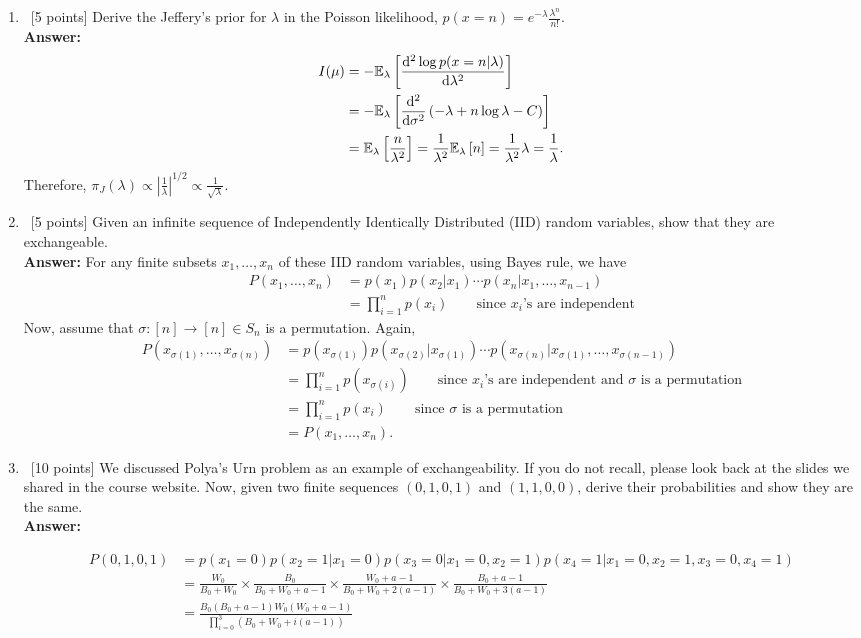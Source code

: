 \documentclass[12pt, fullpage,letterpaper]{article}
\def\red{\color{red}}
\def\blackblue{\color{black!40!blue}}
\begin{document}
\begin{enumerate}
\item~[5 points] Derive the Jeffery's prior for $\lambda$ in the Poisson likelihood, $p(x=n) = e^{-\lambda}\frac{\lambda^n}{n!}$.\\
	{\bf \red Answer:} {\blackblue
	\begin{align*}
	I(\mu) &= -\mathbb{E}_{\lambda}\left[\frac{{\rm d}^2 \log p(x = n|\lambda)}{{\rm d}\lambda^2}\right]\\
	& = - \mathbb{E}_{\lambda}\left[\frac{{\rm d}^2}{{\rm d}\sigma^2}\left(-\lambda + n\log \lambda - C\right)\right]\\
	& = \mathbb{E}_{\lambda}\left[\frac{n}{\lambda^2}\right] = \frac{1}{\lambda^2} \mathbb{E}_{\lambda}\left[n\right] = \frac{1}{\lambda^2}\lambda = \frac{1}{\lambda}.
	\end{align*}
	Therefore, $\pi_J(\lambda) \propto  \left | \frac{1}{\lambda} \right|^{1/2} \propto \frac{1}{\sqrt{\lambda}}.$
	}


\item~[5 points] Given an infinite sequence of Independently Identically Distributed (IID) random variables, show that they are exchangeable.\\
	{\bf \red Answer:} {\blackblue 
	For any finite subsets $x_1,\ldots,x_n$ of these IID random variables, using Bayes rule, we have  
	\begin{align*}
	P(x_1,\ldots,x_n) & = p(x_1)p(x_2|x_1)\cdots p(x_n|x_1,\ldots,x_{n-1})\\
	& = \prod_{i=1}^n p(x_i)\quad\quad \text{since $x_i$'s are independent}
	\end{align*}
	Now, assume that $\sigma:[n]\longrightarrow [n]\in S_n$ is a permutation. Again,
	\begin{align*}
	P(x_{\sigma(1)},\ldots,x_{\sigma(n)}) 
	& = p(x_{\sigma(1)})p(x_{\sigma(2)}|x_{\sigma(1)})\cdots p(x_{\sigma(n)}|x_{\sigma(1)},\ldots,x_{\sigma(n-1)})\\
	& = \prod_{i=1}^n p(x_{\sigma(i)})\quad\quad \text{since $x_i$'s are independent and  $\sigma$ is a permutation}\\
	& = \prod_{i=1}^n p(x_i)\quad\quad \text{since $\sigma$ is a permutation }\\
	& = P(x_1,\ldots,x_n).
	\end{align*}
	}
	\vspace{-.5cm}
\item~[10 points] We discussed Polya's Urn problem as an example of exchangeability. If you do not recall, please look back at the slides we shared in the course website. Now, given  two finite sequences $(0, 1, 0, 1)$ and $(1,1, 0, 0)$,  derive their probabilities and show they are the same. \\
	{\bf \red Answer:} {\blackblue 
	\begin{align*}
	P(0, 1, 0, 1) & = p(x_1 = 0)p(x_2=1|x_1 =0)p(x_3=0|x_1= 0, x_2 = 1)p(x_4 = 1|x_1= 0, x_2 = 1, x_3 = 0, x_4 = 1)\\
	& = \frac{W_0}{B_0+W_0} \times \frac{B_0}{B_0+W_0+ a-1}\times \frac{W_0+a-1}{B_0+W_0+ 2(a-1)}\times \frac{B_0+a-1}{B_0+W_0+ 3(a-1)}\\
	& = \frac{B_0(B_0+a-1)W_0(W_0+a-1)}{\prod_{i=0}^3(B_0+W_0 + i(a-1))}
	\end{align*}
	
}
\end{enumerate}
\end{document}
